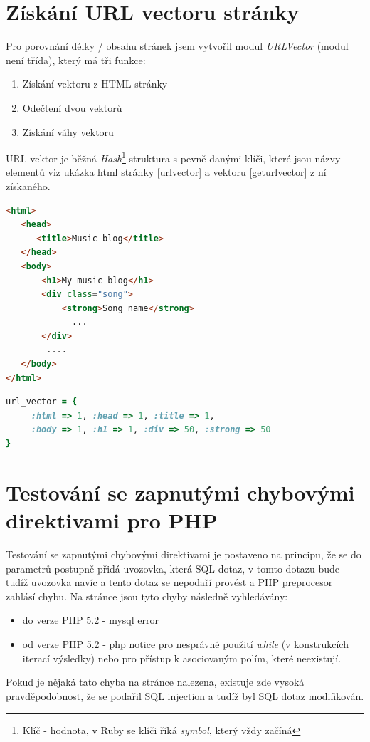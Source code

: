 \documentclass[12pt, a4paper]{report}
\begin{document}
\section{Získání URL vectoru stránky}
Pro porovnání délky / obsahu stránek jsem vytvořil modul \textit{URLVector} (modul není třída), který má tři funkce:
\begin{enumerate}
\item Získání vektoru z HTML stránky
\item Odečtení dvou vektorů
\item Získání váhy vektoru
\end{enumerate}
URL vektor je běžná \textit{Hash}\footnote{Klíč - hodnota, v Ruby se klíči říká \textit{symbol}, který vždy začíná \uv{:}} struktura s pevně danými klíči, které jsou názvy elementů viz ukázka html stránky \ref{urlvector} a vektoru \ref{geturlvector} z ní získaného.
\begin{lstlisting}[label=urlvector,language=HTML, caption=HTML stránka]
<html>
   <head>
      <title>Music blog</title>
   </head>
   <body>
       <h1>My music blog</h1>
       <div class="song">
           <strong>Song name</strong>
             ...
       </div>
        ....
   </body>
</html>
\end{lstlisting}

\begin{lstlisting}[label=geturlvector,language=Ruby, caption=Získaný URL vektor]
url_vector = {
     :html => 1, :head => 1, :title => 1, 
     :body => 1, :h1 => 1, :div => 50, :strong => 50
}
\end{lstlisting}


\section{Testování se zapnutými chybovými direktivami pro PHP}
Testování se zapnutými chybovými direktivami je postaveno na principu, že se do parametrů postupně přidá uvozovka, která  SQL dotaz, v tomto dotazu bude tudíž uvozovka navíc a tento dotaz se nepodaří provést a PHP preprocesor zahlásí chybu. Na stránce jsou tyto chyby následně vyhledávány:
\begin{itemize}
\item do verze PHP 5.2 - mysql$\_$error
\item od verze PHP 5.2 - php notice pro nesprávné použití \textit{while} (v konstrukcích iterací výsledky) nebo pro přístup k asociovaným polím, které neexistují.
\end{itemize}
Pokud je nějaká tato chyba na stránce nalezena, existuje zde vysoká pravděpodobnost, že se podařil SQL injection a tudíž byl SQL dotaz modifikován.
\end{document}
